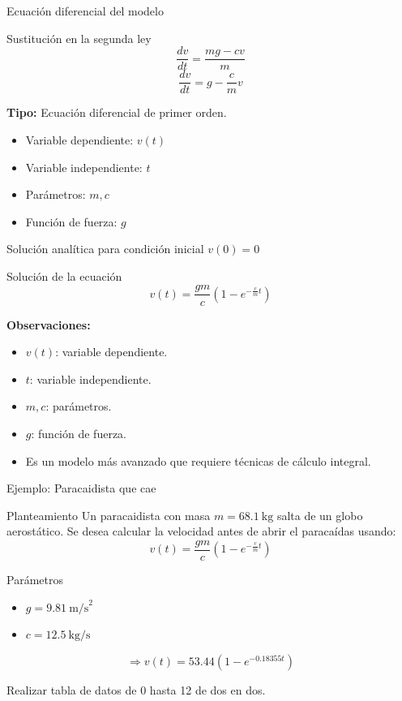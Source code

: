 \documentclass[main.tex]{subfiles}
\begin{document}
\begin{frame}[c]{Ecuación diferencial del modelo}
\begin{block}{Sustitución en la segunda ley}
\[
\frac{dv}{dt} = \frac{mg - cv}{m}
\]
\[
\frac{dv}{dt} = g - \frac{c}{m}v 
\]
\end{block}

\textbf{Tipo:} Ecuación diferencial de primer orden.

\begin{itemize}
  \item Variable dependiente: \(v(t)\)
  \item Variable independiente: \(t\)
  \item Parámetros: \(m, c\)
  \item Función de fuerza: \(g\)
\end{itemize}
\end{frame}

\begin{frame}[c]{Solución analítica para condición inicial \(v(0)=0\)}
\begin{block}{Solución de la ecuación}
\[
v(t) = \frac{gm}{c}\left(1 - e^{-\frac{c}{m}t}\right)
\]
\end{block}

\textbf{Observaciones:}
\begin{itemize}
  \item \(v(t)\): variable dependiente.
  \item \(t\): variable independiente.
  \item \(m, c\): parámetros.
  \item \(g\): función de fuerza.
  \item Es un modelo más avanzado que requiere técnicas de cálculo integral.
\end{itemize}
\end{frame}


\begin{frame}[c]{Ejemplo: Paracaidista que cae}
\begin{block}{Planteamiento}
Un paracaidista con masa \(m = 68.1~\text{kg}\) salta de un globo aerostático. Se desea calcular la velocidad antes de abrir el paracaídas usando:
\[
v(t) = \frac{gm}{c}\left(1 - e^{-\frac{c}{m}t}\right)
\]
\end{block}

\begin{block}{Parámetros}
\begin{itemize}
  \item \(g = 9.81~\text{m/s}^2\)
  \item \(c = 12.5~\text{kg/s}\)
\end{itemize}
\[
\Rightarrow v(t) = 53.44\left(1 - e^{-0.18355t}\right)
\]
\end{block}
Realizar tabla de datos de 0 hasta 12 de dos en dos.
\end{frame}
\end{document}

